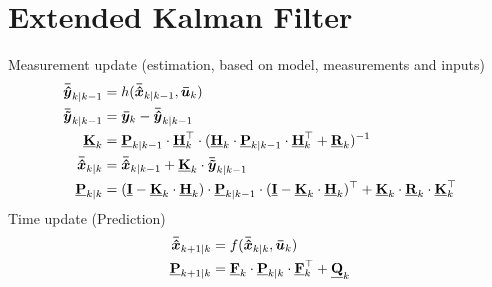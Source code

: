 \section{Extended Kalman Filter} %
\label{sec:extended_kalman_filter}
Measurement update (estimation, based on model, measurements and inputs)
\begin{equation}
        \begin{split}
              \bm{\bar{\hat{y}}}_{k \vert k-1} &= h(\bm{\bar{\hat{x}}}_{k \vert k-1},\bm{\bar{u}}_k) \\
              \bm{\bar{\tilde{y}}}_{k \vert k-1} &= \bm{\bar{y}}_{k} - \bm{\bar{\hat{y}}}_{k \vert k-1} \\
              \mathbf{\underline{{K}}}_k &= \mathbf{\underline{{P}}}_{k \vert k-1} \cdot \mathbf{\underline{{H}}}_{k} ^\top \cdot (\mathbf{\underline{{H}}}_k \cdot \mathbf{\underline{{P}}}_{k \vert k-1} \cdot \mathbf{\underline{{H}}}_{k} ^\top + \mathbf{\underline{{R}}}_k )^{-1}  \\
              \bm{\bar{\hat{x}}}_{k \vert k} &= \bm{\bar{\hat{x}}}_{k \vert k-1} + \mathbf{\underline{{K}}}_k \cdot \bm{\bar{\tilde{y}}}_{k \vert k-1} \\
              \mathbf{\underline{{P}}}_{k \vert k} &= (\mathbf{\underline{{I}}} - \mathbf{\underline{{K}}}_k \cdot \mathbf{\underline{{H}}}_k) \cdot \mathbf{\underline{{P}}}_{k \vert k-1} \cdot (\mathbf{\underline{{I}}} - \mathbf{\underline{{K}}}_k \cdot \mathbf{\underline{{H}}}_k) ^\top + \mathbf{\underline{{K}}}_k \cdot \mathbf{\underline{{R}}}_k \cdot \mathbf{\underline{{K}}}_k ^\top
        \end{split}
\end{equation}
Time update (Prediction)
\begin{equation}
\begin{split}
        \bm{\bar{\hat{x}}}_{k+1 \vert k} &= f(\bm{\bar{\hat{x}}}_{k \vert k}, \bm{\bar{u}}_k) \\
        \mathbf{\underline{{P}}}_{k +1 \vert k} &= \mathbf{\underline{{F}}}_k \cdot \mathbf{\underline{{P}}}_{k \vert k} \cdot \mathbf{\underline{{F}}}_{k}^\top + \mathbf{\underline{{Q}}}_k
\end{split}
\end{equation}


